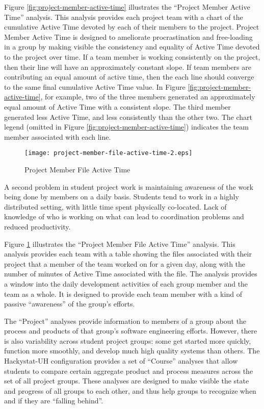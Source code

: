 \documentclass[10pt,twocolumn]{article}
\begin{document}
Figure \ref{fig:project-member-active-time} illustrates the ``Project
Member Active Time'' analysis.  This analysis provides each project team
with a chart of the cumulative Active Time devoted by each of their members
to the project.  Project Member Active Time is designed to ameliorate
procrastination and free-loading in a group by making visible the consistency and
equality of Active Time devoted to the project over time. If a team member
is working consistently on the project, then their line will have an
approximately constant slope.  If team members are contributing an equal
amount of active time, then the each line should converge to the same final
cumulative Active Time value. In Figure
\ref{fig:project-member-active-time}, for example, two of the three members
generated an approximately equal amount of Active Time with a consistent
slope. The third member generated less Active Time, and less consistently
than the other two.  The chart legend (omitted in Figure
\ref{fig:project-member-active-time}) indicates the team member associated
with each line.


\begin{figure}[ht]
  \centering
  \texttt{[image: project-member-file-active-time-2.eps]}
  \caption{Project Member File Active Time}
  \label{fig:project-member-file-active-time}
\end{figure}

A second problem in student project work is maintaining awareness of the
work being done by members on a daily basis.  Students tend to work in a
highly distributed setting, with little time spent physically co-located.
Lack of knowledge of who is working on what can lead to coordination
problems and reduced productivity.

Figure \ref{fig:project-member-file-active-time} illustrates the ``Project
Member File Active Time'' analysis.  This analysis provides each team with
a table showing the files associated with their project that a member of
the team worked on for a given day, along with the number of minutes of
Active Time associated with the file.  The analysis provides a window into
the daily development activities of each group member and the team as a
whole.  It is designed to provide each team member with a kind of passive
``awareness'' of the group's efforts.


The ``Project'' analyses provide information to members of a group about
the process and products of that group's software engineering efforts.  
However, there is also variability across student project groups: some get started
more quickly, function more smoothly, and develop much high quality systems
than others.  The Hackystat-UH configuration provides a set of ``Course''
analyses that allow students to compare certain aggregate product and
process measures across the set of all project groups. These analyses are
designed to make visible the state and progress of all groups to each
other, and thus help groups to recognize when and if they are ``falling
behind''. 
\end{document}
